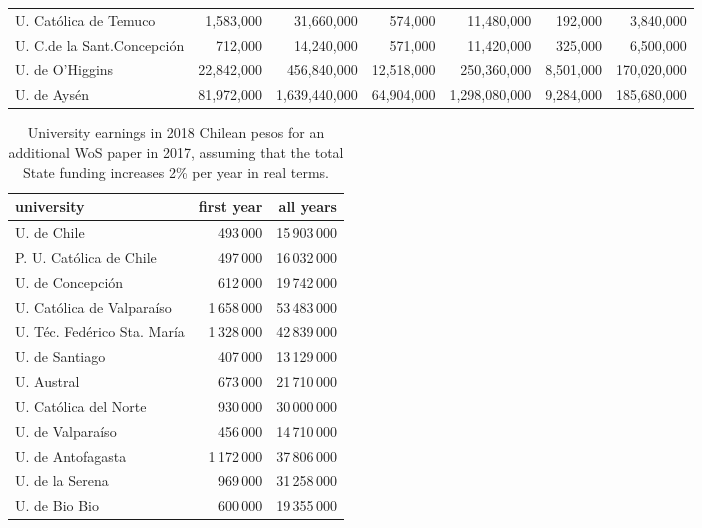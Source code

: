 \documentclass[twocolumn]{article}
\begin{document}
\begin{table}
\begin{tabular}{l rr rr rr}
U. Católica de Temuco          &   1,583,000 &    31,660,000 &     574,000 &    11,480,000 &     192,000 &     3,840,000 \\
U. C.de la Sant.Concepción     &     712,000 &    14,240,000 &     571,000 &    11,420,000 &     325,000 &     6,500,000 \\
U. de O'Higgins                &  22,842,000 &   456,840,000 &  12,518,000 &   250,360,000 &   8,501,000 &   170,020,000 \\
U. de Aysén                    &  81,972,000 & 1,639,440,000 &  64,904,000 & 1,298,080,000 &   9,284,000 &   185,680,000 \\
\hline
\end{tabular}
\end{table}



\begin{table}
\centering
\caption{University earnings in 2018 Chilean pesos for an additional 
WoS paper in 2017, assuming that the total State funding increases 
2\% per  year in real terms.}
\label{tab:papercost}
\begin{tabular}{lrr}
\hline\hline                             
university                   &  first year &  all years\\              
\hline                                                        
U. de Chile                  &    493\,000 &  15\,903\,000\\  
P. U. Católica de Chile      &    497\,000 &  16\,032\,000\\
U. de Concepción             &    612\,000 &  19\,742\,000\\
U. Católica de Valparaíso    & 1\,658\,000 &  53\,483\,000\\
U. Téc. Fedérico Sta. María  & 1\,328\,000 &  42\,839\,000\\
U. de Santiago               &    407\,000 &  13\,129\,000\\
U. Austral                   &    673\,000 &  21\,710\,000\\
U. Católica del Norte        &    930\,000 &  30\,000\,000\\
U. de Valparaíso             &    456\,000 &  14\,710\,000\\
U. de Antofagasta            & 1\,172\,000 &  37\,806\,000\\
U. de la Serena              &    969\,000 &  31\,258\,000\\
U. de Bio Bio                &    600\,000 &  19\,355\,000\\

\end{tabular}
\end{table}
\end{document}
